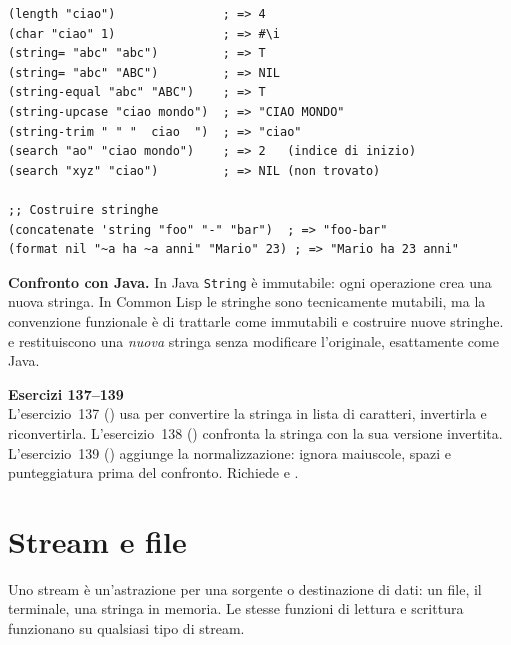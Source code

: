 \begin{esempio}
\begin{lstlisting}
(length "ciao")               ; => 4
(char "ciao" 1)               ; => #\i
(string= "abc" "abc")         ; => T
(string= "abc" "ABC")         ; => NIL
(string-equal "abc" "ABC")    ; => T
(string-upcase "ciao mondo")  ; => "CIAO MONDO"
(string-trim " " "  ciao  ")  ; => "ciao"
(search "ao" "ciao mondo")    ; => 2   (indice di inizio)
(search "xyz" "ciao")         ; => NIL (non trovato)

;; Costruire stringhe
(concatenate 'string "foo" "-" "bar")  ; => "foo-bar"
(format nil "~a ha ~a anni" "Mario" 23) ; => "Mario ha 23 anni"
\end{lstlisting}
\end{esempio}

\begin{confronto}
\textbf{Confronto con Java.}
In Java \texttt{String} è immutabile: ogni operazione
crea una nuova stringa. In Common Lisp le stringhe sono
tecnicamente mutabili, ma la convenzione funzionale è
di trattarle come immutabili e costruire nuove stringhe.
 e  restituiscono
una \emph{nuova} stringa senza modificare l'originale,
esattamente come Java.
\end{confronto}

\begin{workbook}
\textbf{Esercizi 137--139}\\[4pt]
L'esercizio~137 () usa  per convertire
la stringa in lista di caratteri, invertirla e riconvertirla.
L'esercizio~138 () confronta la stringa con
la sua versione invertita.
L'esercizio~139 () aggiunge
la normalizzazione: ignora maiuscole, spazi e punteggiatura
prima del confronto. Richiede  e .
\end{workbook}

\section{Stream e file}

Uno stream è un'astrazione per una sorgente o destinazione
di dati: un file, il terminale, una stringa in memoria.
Le stesse funzioni di lettura e scrittura funzionano
su qualsiasi tipo di stream.

